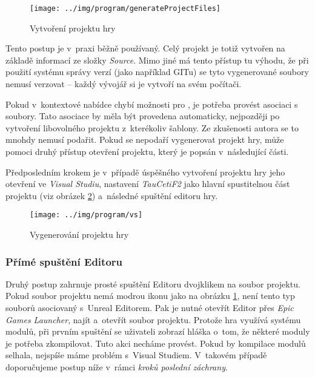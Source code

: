 \begin{figure}[!ht]\centering
\texttt{[image: ../img/program/generateProjectFiles]}

\caption{Vytvoření projektu hry}
\label{fig:generateProjectFiles}

\end{figure}
\FloatBarrier

Tento postup je v~praxi běžně používaný. Celý projekt je totiž vytvořen na základě informací ze složky \textit{Source}. Mimo jiné má tento přístup tu výhodu, že při použití systému správy verzí (jako například GITu) se tyto vygenerované soubory nemusí verzovat -- každý vývojář si je vytvoří na svém počítači.

Pokud v~kontextové nabídce chybí možnosti pro \UE{}, je potřeba provést asociaci s~ soubory. Tato asociace by měla být provedena automaticky, nejpozději po vytvoření libovolného \CPP{} projektu z~kterékoliv šablony. Ze zkušenosti autora se to mnohdy nemusí podařit. Pokud se nepodaří vygenerovat projekt hry, může pomoci druhý přístup otevření projektu, který je popsán v~následující části.

Předposledním krokem je v~případě úspěšného vytvoření projektu hry jeho otevření ve \textit{Visual Studiu}, nastavení \textit{TauCetiF2} jako hlavní spustitelnou část projektu (viz obrázek \ref{fig:vs}) a~následné spuštění editoru hry.


\begin{figure}[!ht]\centering
\texttt{[image: ../img/program/vs]}

\caption{Vygenerování projektu hry}
\label{fig:vs}

\end{figure}

\FloatBarrier



\subsubsection{Přímé spuštění Editoru}
Druhý postup zahrnuje prosté spuštění Editoru dvojklikem na soubor projektu. Pokud soubor projektu nemá modrou ikonu jako na obrázku \ref{fig:generateProjectFiles}, není tento typ souborů asociovaný s~Unreal Editorem. Pak je nutné otevřít Editor přes \textit{Epic Games Launcher}, najít a~otevřít soubor projektu. Protože hra využívá systému modulů, při prvním spuštění se uživateli zobrazí hláška o~tom, že některé moduly je potřeba zkompilovat. Tuto akci necháme provést. Pokud by kompilace modulů selhala, nejspíše máme problém s~Visual Studiem. V~takovém případě doporučujeme postup níže v~rámci \textit{kroků poslední záchrany}.

